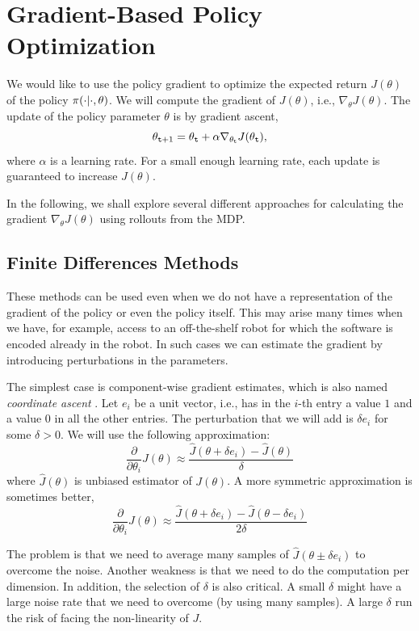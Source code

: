 \section{Gradient-Based Policy Optimization}
We would like to use the policy gradient to optimize the expected
return  $J(\theta)$ of the policy $\pi(\cdot|\cdot,\theta)$. We
will compute the gradient of $J(\theta)$, i.e., $\nabla_\theta
J(\theta)$. The update of the policy parameter $\theta$ is by gradient ascent,
\[
\theta_{{\tt t}+1}=\theta_{\tt t} + \alpha \nabla_{\theta_{\tt t}}
J(\theta_{\tt t}),
\]
where $\alpha$ is a learning rate. For a small enough learning rate, each update is guaranteed to increase $J(\theta)$.

In the following, we shall explore several different approaches for calculating the gradient $\nabla_{\theta} J(\theta)$ using rollouts from the MDP.




\subsection{Finite Differences Methods}

These methods can be used even when we do not have a representation
of the gradient of the policy or even the policy itself. This may
arise many times when we have, for example, access to an
off-the-shelf robot for which the software is encoded already in the
robot. In such cases we can estimate the gradient by introducing
perturbations in the parameters.

The simplest case is component-wise gradient estimates, which is also named \emph{coordinate ascent} . Let $e_i$ be
a unit vector, i.e., has in the $i$-th entry a value $1$ and a value
$0$ in all the other entries. The perturbation that we will add is
$\delta e_i$ for some $\delta >0$. We will use the following
approximation:
\[
\frac{\partial}{\partial \theta_i}J(\theta)\approx
\frac{\hat{J}(\theta+\delta e_i)-\hat{J}(\theta)}{\delta}
\]
where $\hat{J}(\theta)$ is unbiased estimator of $J(\theta)$. A more
symmetric approximation is sometimes better,
\[
\frac{\partial}{\partial \theta_i}J(\theta)\approx
\frac{\hat{J}(\theta+\delta e_i)-\hat{J}(\theta-\delta e_i
)}{2\delta}
\]

The problem is that we need to average many samples of
$\hat{J}(\theta\pm\delta e_i)$ to overcome the noise. Another
weakness is that we need to do the computation per dimension. In
addition, the selection of $\delta$ is also critical. A small
$\delta$ might have a large noise rate that we need to overcome (by
using many samples). A large $\delta$ run the risk of facing the
non-linearity of $J$.

